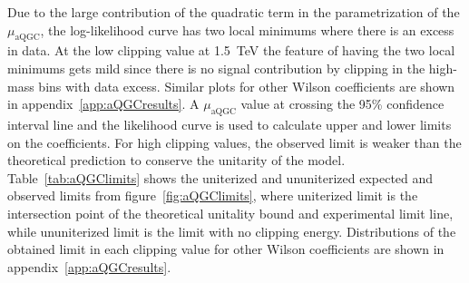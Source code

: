 Due to the large contribution of the quadratic term in the parametrization of the $\mu_\mathrm{aQGC}$, the log-likelihood curve has two local minimums where there is an excess in data.
At the low clipping value at 1.5~TeV the feature of having the two local minimums gets mild since there is no signal contribution by clipping in the high-mass bins with data excess.
Similar plots for other Wilson coefficients are shown in appendix~\ref{app:aQGCresults}. 
A $\mu_\mathrm{aQGC}$ value at crossing the 95\% confidence interval line and the likelihood curve is used to calculate upper and lower limits on the coefficients. 
For high clipping values, the observed limit is weaker than the theoretical prediction to conserve the unitarity of the model.
Table~\ref{tab:aQGClimits} shows the uniterized and ununiterized expected and observed limits from figure~\ref{fig:aQGClimits}, where uniterized limit is the intersection point of the theoretical unitality bound and experimental limit line, while ununiterized limit is the limit with no clipping energy.
Distributions of the obtained limit in each clipping value for other Wilson coefficients are shown in appendix~\ref{app:aQGCresults}.
